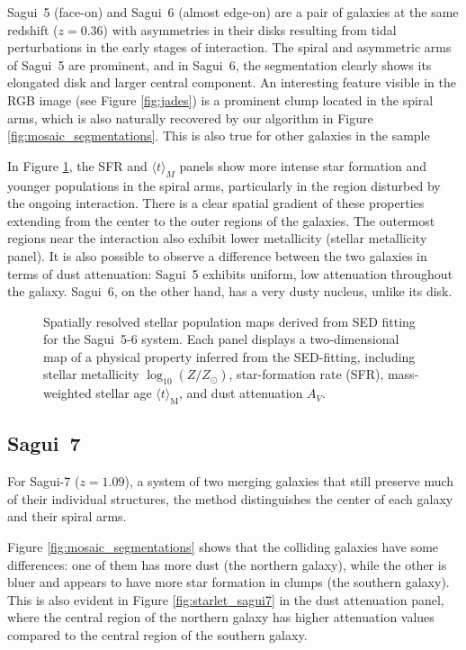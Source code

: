 \documentclass[fleqn,usenatbib]{mnras}
\begin{document}
Sagui~5 (face-on) and Sagui~6 (almost edge-on) are a pair of galaxies at the same redshift ($z=0.36$) with asymmetries in their disks resulting from tidal perturbations in the early stages of interaction. The spiral and asymmetric arms of Sagui~5 are prominent, and in Sagui~6, the segmentation clearly shows its elongated disk and larger central component. An interesting feature visible in the RGB image (see Figure \ref{fig:jades}) is a prominent clump located in the spiral arms, which is also naturally recovered by our algorithm in Figure \ref{fig:mosaic_segmentations}. This is also true for other galaxies in the sample

In Figure \ref{fig:starlet_sagui56}, the SFR and $\langle t \rangle_{M}$ panels show more intense star formation and younger populations in the spiral arms, particularly in the region disturbed by the ongoing interaction. There is a clear spatial gradient of these properties extending from the center to the outer regions of the galaxies. The outermost regions near the interaction also exhibit lower metallicity (stellar metallicity panel). It is also possible to observe a difference between the two galaxies in terms of dust attenuation: Sagui~5 exhibits uniform, low attenuation throughout the galaxy. Sagui~6, on the other hand, has a very dusty nucleus, unlike its disk.


 \begin{figure}
\centering
{}
\caption{Spatially resolved stellar population maps derived from SED fitting for the Sagui~5-6 system. Each panel displays a two-dimensional map of a physical property inferred from the SED-fitting, including stellar metallicity $\log_{10}(Z/Z_\odot)$, star-formation rate (SFR), mass-weighted stellar age $\langle t\rangle_{\mathrm{M}}$, and dust attenuation $A_V$.}
\label{fig:starlet_sagui56}
\end{figure}

\subsection{Sagui~7}


For Sagui-7 ($z=1.09$), a system of two merging galaxies that still preserve much of their individual structures, the method distinguishes the center of each galaxy and their spiral arms. 

Figure \ref{fig:mosaic_segmentations} shows that the colliding galaxies have some differences: one of them has more dust (the northern galaxy), while the other is bluer and appears to have more star formation in clumps (the southern galaxy). This is also evident in Figure \ref{fig:starlet_sagui7} in the dust attenuation panel, where the central region of the northern galaxy has higher attenuation values compared to the central region of the southern galaxy. 
\end{document}
